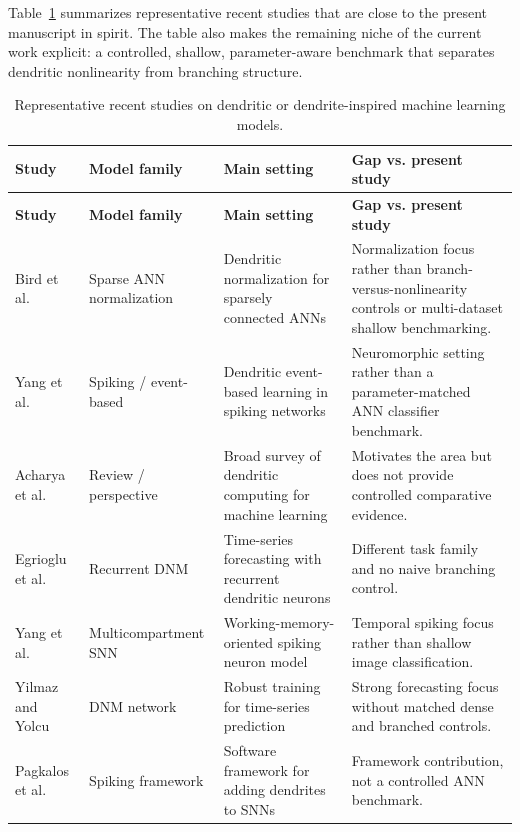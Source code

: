 \documentclass[preprint,12pt]{elsarticle}
\begin{document}
Table~\ref{tab:recentstudies} summarizes representative recent studies that are close to the present manuscript in spirit. The table also makes the remaining niche of the current work explicit: a controlled, shallow, parameter-aware benchmark that separates dendritic nonlinearity from branching structure.

\begingroup
\scriptsize
\setlength{\tabcolsep}{3pt}
\renewcommand{\arraystretch}{1.08}
\begin{longtable}{p{1.95cm} p{1.55cm} p{3.80cm} p{5.45cm}}
\caption{Representative recent studies on dendritic or dendrite-inspired machine learning models.}
\label{tab:recentstudies}\\
\toprule
\textbf{Study} & \textbf{Model family} & \textbf{Main setting} & \textbf{Gap vs. present study} \\
\midrule
\endfirsthead
\toprule
\textbf{Study} & \textbf{Model family} & \textbf{Main setting} & \textbf{Gap vs. present study} \\
\midrule
\endhead
Bird et al.\ \cite{bird2021dendriticnorm} & Sparse ANN normalization & Dendritic normalization for sparsely connected ANNs & Normalization focus rather than branch-versus-nonlinearity controls or multi-dataset shallow benchmarking. \\
Yang et al.\ \cite{yang2021event} & Spiking / event-based & Dendritic event-based learning in spiking networks & Neuromorphic setting rather than a parameter-matched ANN classifier benchmark. \\
Acharya et al.\ \cite{acharya2022dendriticcomputing} & Review / perspective & Broad survey of dendritic computing for machine learning & Motivates the area but does not provide controlled comparative evidence. \\
Egrioglu et al.\ \cite{egrioglu2022recurrent} & Recurrent DNM & Time-series forecasting with recurrent dendritic neurons & Different task family and no naive branching control. \\
Yang et al.\ \cite{yang2022sam} & Multicompartment SNN & Working-memory-oriented spiking neuron model & Temporal spiking focus rather than shallow image classification. \\
Yilmaz and Yolcu \cite{yilmaz2023robust} & DNM network & Robust training for time-series prediction & Strong forecasting focus without matched dense and branched controls. \\
Pagkalos et al.\ \cite{pagkalos2023dendrify} & Spiking framework & Software framework for adding dendrites to SNNs & Framework contribution, not a controlled ANN benchmark. \\

\end{longtable}
\end{document}
